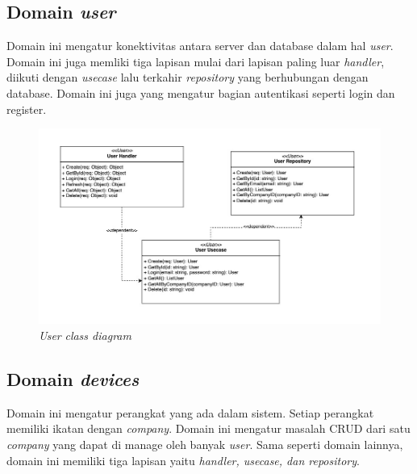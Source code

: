 \pagebreak

\subsection{Domain \textit{user}}

Domain ini mengatur konektivitas antara server dan database dalam hal \textit{user}. Domain ini juga memliki tiga lapisan mulai dari lapisan paling luar \textit{handler}, diikuti dengan \textit{usecase} lalu terkahir \textit{repository} yang berhubungan dengan database. Domain ini juga yang mengatur bagian autentikasi seperti login dan register.

\begin{figure}[h]
  \centering
  \includegraphics[width=1\textwidth]{resources/chapter-3/class/user-class-diagram.jpg}
  \caption{\textit{User} \textit{class diagram}}
  \label{fig:user-class-diagram}
\end{figure}

\subsection{Domain \textit{devices}}

Domain ini mengatur perangkat yang ada dalam sistem. Setiap perangkat memiliki ikatan dengan \textit{company}. Domain ini mengatur masalah CRUD dari satu \textit{company} yang dapat di manage oleh banyak \textit{user}. Sama seperti domain lainnya, domain ini memiliki tiga lapisan yaitu \textit{handler, usecase, dan repository}.

